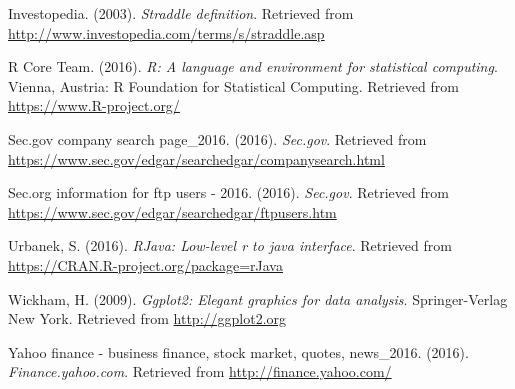 \documentclass[english,man]{apa6}
\begin{document}
\hypertarget{ref-straddle}{}
Investopedia. (2003). \emph{Straddle definition}. Retrieved from
\url{http://www.investopedia.com/terms/s/straddle.asp}

\hypertarget{ref-R-base}{}
R Core Team. (2016). \emph{R: A language and environment for statistical
computing}. Vienna, Austria: R Foundation for Statistical Computing.
Retrieved from \url{https://www.R-project.org/}

\hypertarget{ref-sec_1}{}
Sec.gov \textbar{} company search page\_2016. (2016). \emph{Sec.gov}.
Retrieved from
\url{https://www.sec.gov/edgar/searchedgar/companysearch.html}

\hypertarget{ref-sec_2}{}
Sec.org \textbar{} information for ftp users - 2016. (2016).
\emph{Sec.gov}. Retrieved from
\url{https://www.sec.gov/edgar/searchedgar/ftpusers.htm}

\hypertarget{ref-R-rJava}{}
Urbanek, S. (2016). \emph{RJava: Low-level r to java interface}.
Retrieved from \url{https://CRAN.R-project.org/package=rJava}

\hypertarget{ref-R-ggplot2}{}
Wickham, H. (2009). \emph{Ggplot2: Elegant graphics for data analysis}.
Springer-Verlag New York. Retrieved from \url{http://ggplot2.org}

\hypertarget{ref-yahoo_1}{}
Yahoo finance - business finance, stock market, quotes, news\_2016.
(2016). \emph{Finance.yahoo.com}. Retrieved from
\url{http://finance.yahoo.com/}
\end{document}

